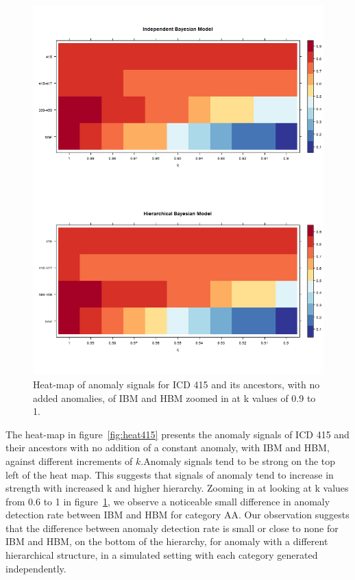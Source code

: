 \begin{figure}[!h]
	\centering
	\includegraphics[width=1\linewidth]{../../R-codes/JAGS/plots/mimic/heat4152}
	\caption{Heat-map of anomaly signals for ICD 415 and its ancestors, with no added anomalies, of IBM and HBM zoomed in at k values of 0.9 to 1.}
	\label{fig:heat4152}
\end{figure}

\newpage

The heat-map in figure~\ref{fig:heat415} presents the anomaly signals of ICD 415 and their ancestors with no addition of a constant anomaly, with IBM and HBM, against different increments of $k$.Anomaly signals tend to be strong on the top left of the heat map. This suggests that signals of anomaly tend to increase in strength with increased k and higher hierarchy. Zooming in at looking at k values from 0.6 to 1 in figure~\ref{fig:heat4152}, we observe a noticeable small difference in anomaly detection rate between IBM and HBM for category AA. Our observation suggests that the difference between anomaly detection rate is small or close to none for IBM and HBM, on the bottom of the hierarchy, for anomaly with a different hierarchical structure, in a simulated setting with each category generated independently.

